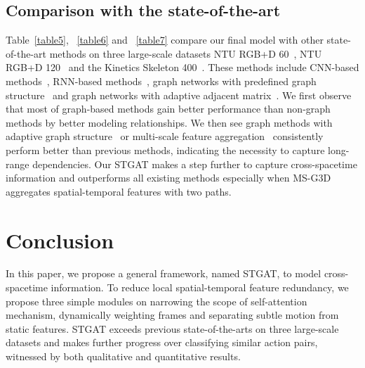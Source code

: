\documentclass[runningheads]{llncs}
\begin{document}
\subsection{Comparison with the state-of-the-art}
Table~\ref{table5}, ~\ref{table6} and ~\ref{table7} compare our final model with other state-of-the-art methods on three large-scale datasets NTU RGB+D 60~\cite{shahroudy2016ntu}, NTU RGB+D 120~\cite{shahroudy2016ntu} and the Kinetics Skeleton 400~\cite{kay2017kinetics}. These methods include CNN-based methods~\cite{li2018co}, RNN-based methods~\cite{liu2016spatio,si2019attention}, graph networks with predefined graph structure~\cite{li2019actional,liu2020disentangling,shi2019skeleton1,yan2018spatial,cheng2020skeleton} and graph networks with adaptive adjacent matrix~\cite{shi2019two,shi2019skeleton,shi2020decoupled,zhang2020semantics,ye2020dynamic}. We first observe that most of graph-based methods gain better performance than non-graph methods by better modeling relationships. We then see graph methods with adaptive graph structure~\cite{shi2019two,shi2019skeleton,shi2020decoupled,zhang2020semantics,ye2020dynamic} or multi-scale feature aggregation~\cite{liu2020disentangling} consistently perform better than previous methods, indicating the necessity to capture long-range dependencies. Our STGAT makes a step further to capture cross-spacetime information and outperforms all existing methods especially when MS-G3D aggregates spatial-temporal features with two paths. 
\section{Conclusion}
\vspace{-5px}
In this paper, we propose a general framework, named STGAT, to model cross-spacetime information. To reduce local spatial-temporal feature redundancy, we propose three simple modules on narrowing the scope of self-attention mechanism, dynamically weighting frames and separating subtle motion from static features. STGAT exceeds previous state-of-the-arts on three large-scale datasets and makes further progress over classifying similar action pairs, witnessed by both qualitative and quantitative results.
\vspace{10px}
\end{document}
